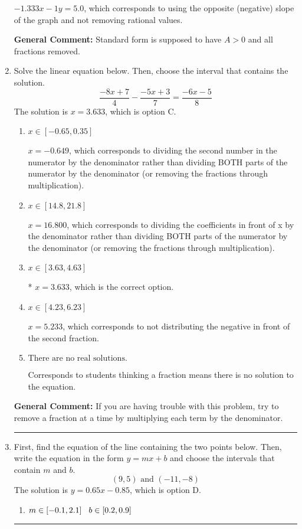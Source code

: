 \documentclass{extbook}[14pt]
\newcommand{\litem}[1]{\item #1

\rule{\textwidth}{0.4pt}}
\begin{document}
\begin{enumerate}
{\begin{enumerate}[label=\Alph*.]
 $-1.333x - 1y = 5.0$, which corresponds to using the opposite (negative) slope of the graph and not removing rational values.
\end{enumerate}

\textbf{General Comment:} Standard form is supposed to have $A > 0$ and all fractions removed.
}
\litem{
Solve the linear equation below. Then, choose the interval that contains the solution.
\[ \frac{-8x + 7}{4} - \frac{-5x + 3}{7} = \frac{-6x -5}{8} \]The solution is \( x = 3.633 \), which is option C.\begin{enumerate}[label=\Alph*.]
\item \( x \in [-0.65, 0.35] \)

 $x = -0.649$, which corresponds to dividing the second number in the numerator by the denominator rather than dividing BOTH parts of the numerator by the denominator (or removing the fractions through multiplication).
\item \( x \in [14.8, 21.8] \)

 $x = 16.800$, which corresponds to dividing the coefficients in front of x by the denominator rather than dividing BOTH parts of the numerator by the denominator (or removing the fractions through multiplication).
\item \( x \in [3.63, 4.63] \)

* $x = 3.633$, which is the correct option.
\item \( x \in [4.23, 6.23] \)

 $x = 5.233$, which corresponds to not distributing the negative in front of the second fraction.
\item \( \text{There are no real solutions.} \)

Corresponds to students thinking a fraction means there is no solution to the equation.
\end{enumerate}

\textbf{General Comment:} If you are having trouble with this problem, try to remove a fraction at a time by multiplying each term by the denominator.
}
\litem{
First, find the equation of the line containing the two points below. Then, write the equation in the form $ y=mx+b $ and choose the intervals that contain $m$ and $b$.
\[ (9, 5) \text{ and } (-11, -8) \]The solution is \( y = 0.65x -0.85 \), which is option D.\begin{enumerate}[label=\Alph*.]
\item \( m \in [-0.1, 2.1] \hspace*{3mm} b \in [0.2, 0.9] \)


\end{enumerate}}
\end{enumerate}
\end{document}
